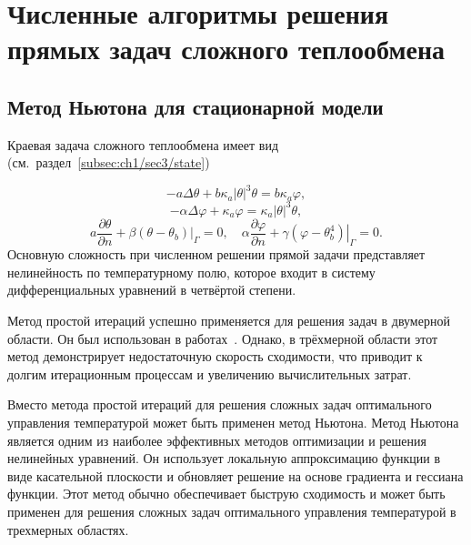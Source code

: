 \section{Численные алгоритмы решения прямых задач сложного теплообмена}
\label{sec:ch4/sec1}

\subsection{Метод Ньютона для стационарной модели}
\label{subsec:ch4/sec1/stationary}
Краевая задача сложного теплообмена
имеет вид (см.\ раздел~\ref{subsec:ch1/sec3/state})

\begin{equation}
    \label{eq:4_1:1}
        -a \Delta \theta+b \kappa_{a}| \theta|^{3} \theta =
        b \kappa_{a} \varphi,
\end{equation}
\begin{equation}
    \label{eq:4_1:2}
        -\alpha \Delta \varphi+\kappa_{a} \varphi =
        \kappa_{a}|\theta|^{3} \theta,
\end{equation}
\begin{equation}
    \label{eq:4_1:3}
        a \frac{\partial \theta}{\partial n}
        +\left.\beta\left(\theta-\theta_{b}\right)\right|_{\Gamma}=0,
        \quad \alpha \frac{\partial \varphi}{\partial n}
        +\left.\gamma\left(\varphi-\theta_{b}^{4}\right)\right|_{\Gamma}=0.
\end{equation}
Основную сложность при численном решении прямой задачи представляет нелинейность
по температурному полю, которое входит в систему
дифференциальных уравнений в четвёртой степени.

Метод простой итераций успешно применяется для решения задач в двумерной области.
Он был использован в работах~\cite{Kovtanyuk2015,astrakhantseva2014numerical}.
Однако, в трёхмерной области этот метод демонстрирует недостаточную скорость сходимости,
что приводит к долгим итерационным процессам и увеличению вычислительных затрат.

Вместо метода простой итераций для решения сложных задач оптимального управления
температурой может быть применен метод Ньютона.
Метод Ньютона является одним из наиболее эффективных методов оптимизации
и решения нелинейных уравнений.
Он использует локальную аппроксимацию функции в виде касательной плоскости
и обновляет решение на основе градиента и гессиана функции.
Этот метод обычно обеспечивает быструю сходимость и может быть
применен для решения сложных задач оптимального
управления температурой в трехмерных областях.


